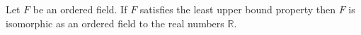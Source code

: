 \documentclass[12pt]{article}
\begin{document}
Let $F$ be an ordered field.  If $F$ satisfies the least upper bound property
then $F$ is isomorphic as an ordered field to the real numbers $\mathbb{R}$.
\end{document}
